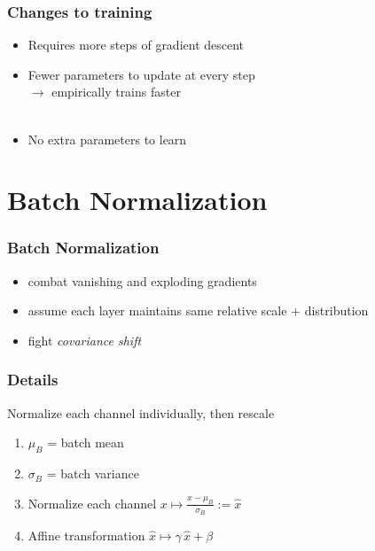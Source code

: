 \documentclass[aspectratio=169,14pt]{beamer}
\begin{document}
\begin{frame}
    \frametitle{Changes to training}
\begin{itemize}
    \item Requires more steps of gradient descent
    \item Fewer parameters to update at every step \\ \qquad\qquad $\rightarrow$ empirically trains faster ~\\~\\
    \item No extra parameters to learn
\end{itemize}
\end{frame}



\section{Batch Normalization}
\begin{frame}
    \frametitle{Batch Normalization}
    \begin{itemize}
        \item combat vanishing and exploding gradients
        \item assume each layer maintains same relative scale + distribution
        \item fight \emph{covariance shift}
    \end{itemize}
\end{frame}


\begin{frame}
    \frametitle{Details}
Normalize each channel individually, then rescale
\begin{enumerate}
    \item $\mu_B$ = batch mean
    \item $\sigma_B$ = batch variance
    \item Normalize each channel $x \longmapsto \frac{x - \mu_B}{\sigma_B} := \hat{x}$
    \item Affine transformation $\hat{x} \longmapsto \gamma \, \hat{x} + \beta$
\end{enumerate}
\end{frame}
\end{document}

